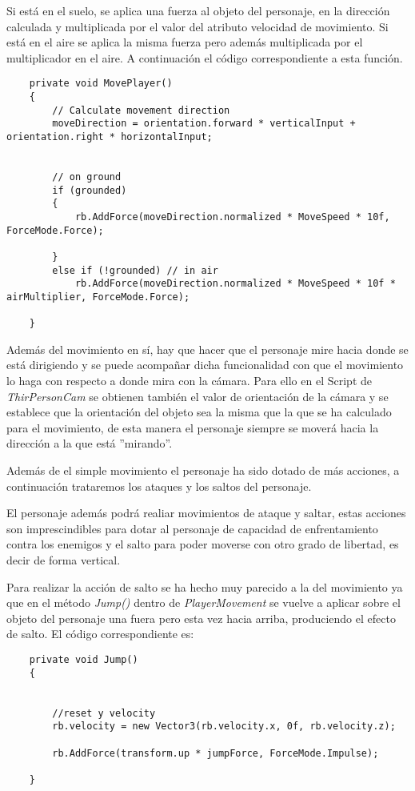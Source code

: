 Si está en el suelo, se aplica una fuerza al objeto del personaje, en la dirección calculada y multiplicada por el valor del atributo velocidad de movimiento. Si está en el aire se aplica la misma fuerza pero además multiplicada por el multiplicador en el aire. A continuación el código correspondiente a esta función. 

\begin{lstlisting}
    private void MovePlayer()
    {
        // Calculate movement direction
        moveDirection = orientation.forward * verticalInput + orientation.right * horizontalInput;


        // on ground 
        if (grounded) 
        { 
            rb.AddForce(moveDirection.normalized * MoveSpeed * 10f, ForceMode.Force);

        }
        else if (!grounded) // in air
            rb.AddForce(moveDirection.normalized * MoveSpeed * 10f * airMultiplier, ForceMode.Force);

    }
    \end{lstlisting}

    Además del movimiento en sí, hay que hacer que el personaje mire hacia donde se está dirigiendo y se puede acompañar dicha funcionalidad con que el movimiento lo haga con respecto a donde mira con la cámara. Para ello en el Script de \textit{ThirPersonCam} se obtienen también el valor de orientación de la cámara y se establece que la orientación del objeto sea la misma que la que se ha calculado para el movimiento, de esta manera el personaje siempre se moverá hacia la dirección a la que está ''mirando''.

    Además de el simple movimiento el personaje ha sido dotado de más acciones, a continuación trataremos los ataques y los saltos del personaje.

    El personaje además podrá realiar movimientos de ataque y saltar, estas acciones son imprescindibles para dotar al personaje de capacidad de enfrentamiento contra los enemigos y el salto para poder moverse con otro grado de libertad, es decir de forma vertical.

    Para realizar la acción de salto se ha hecho muy parecido a la del movimiento ya que en el método \textit{Jump()} dentro de \textit{PlayerMovement} se vuelve a aplicar sobre el objeto del personaje una fuera pero esta vez hacia arriba, produciendo el efecto de salto. El código correspondiente es: 
    
\begin{lstlisting}
    private void Jump()
    {

        
        //reset y velocity
        rb.velocity = new Vector3(rb.velocity.x, 0f, rb.velocity.z);

        rb.AddForce(transform.up * jumpForce, ForceMode.Impulse);
       
    }
\end{lstlisting}

